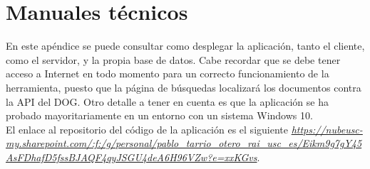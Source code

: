 \chapter{Manuales técnicos}

En este apéndice se puede consultar como desplegar la aplicación, tanto el cliente, como el servidor, y la propia base de datos. Cabe recordar que se debe tener acceso a Internet en todo momento para un correcto funcionamiento de la herramienta, puesto que la página de búsquedas localizará los documentos contra la API del DOG. Otro detalle a tener en cuenta es que la aplicación se ha probado mayoritariamente en un entorno con un sistema Windows 10.
\\

El enlace al repositorio del código de la aplicación es el siguiente {\it \url{https://nubeusc-my.sharepoint.com/:f:/g/personal/pablo_tarrio_otero_rai_usc_es/Eikm9g7gY45AsFDhafD5fssBJAQF4qyJSGU4deA6H96VZw?e=xxKGvs}}.


